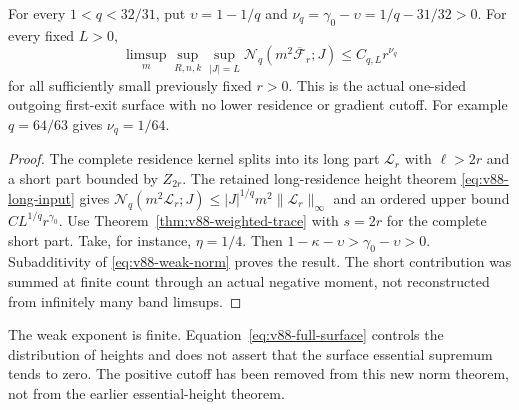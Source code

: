\begin{theorem}
\label{thm:v88-full-surface}
For every $1<q<32/31$, put $\upsilon=1-1/q$ and
$\nu_q=\gamma_0-\upsilon=1/q-31/32>0$. For every fixed $L>0$,
\begin{equation}\label{eq:v88-full-surface}
 \limsup_m\sup_{R,n,k}\sup_{|J|=L}
       \mathcal N_q(m^2\overline{\mathcal F}_r;J)
                                  \le C_{q,L}r^{\nu_q}
\end{equation}
for all sufficiently small previously fixed $r>0$. This is the
actual one-sided outgoing first-exit surface with no lower residence
or gradient cutoff. For example $q=64/63$ gives $\nu_q=1/64$.
\end{theorem}
\begin{proof}
The complete residence kernel splits into its long part $\mathcal L_r$
with $\ell>2r$ and a short part bounded by $Z_{2r}$. The retained
long-residence height theorem \eqref{eq:v88-long-input} gives
$\mathcal N_q(m^2\mathcal L_r;J)\le |J|^{1/q}m^2\|\mathcal L_r\|_\infty$
and an ordered upper bound $CL^{1/q}r^{\gamma_0}$.
Use Theorem~\ref{thm:v88-weighted-trace} with $s=2r$ for the
complete short part. Take, for instance, $\eta=1/4$. Then
$1-\kappa-\upsilon>\gamma_0-\upsilon>0$.
Subadditivity of \eqref{eq:v88-weak-norm} proves the result.
The short contribution was summed at finite count through an actual
negative moment, not reconstructed from infinitely many band limsups.
\end{proof}

The weak exponent is finite. Equation~\eqref{eq:v88-full-surface}
controls the distribution of heights and does not assert that the
surface essential supremum tends to zero. The positive cutoff has
been removed from this new norm theorem, not from the earlier
essential-height theorem.
